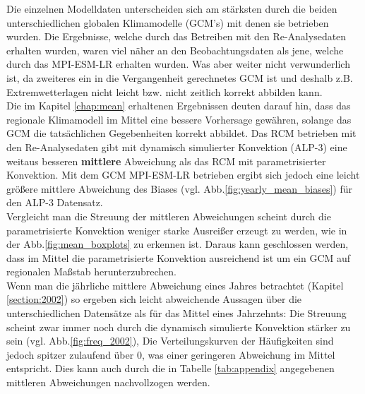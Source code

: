 Die einzelnen Modelldaten unterscheiden sich am stärksten durch die beiden unterschiedlichen globalen Klimamodelle (GCM's) mit denen sie betrieben wurden. Die Ergebnisse, welche durch das Betreiben mit den Re-Analysedaten erhalten wurden, waren viel näher an den Beobachtungsdaten als jene, welche durch das MPI-ESM-LR erhalten wurden. Was aber weiter nicht verwunderlich ist, da zweiteres ein in die Vergangenheit gerechnetes GCM ist und deshalb z.B. Extremwetterlagen nicht leicht bzw. nicht zeitlich korrekt abbilden kann.\vspace{7pt}\\

Die im Kapitel \ref{chap:mean} erhaltenen Ergebnissen deuten darauf hin, dass das regionale Klimamodell im Mittel eine bessere Vorhersage gewähren, solange das GCM die tatsächlichen Gegebenheiten korrekt abbildet. Das RCM betrieben mit den Re-Analysedaten gibt mit dynamisch simulierter Konvektion (ALP-3) eine weitaus besseren \textbf{mittlere} Abweichung als das RCM mit parametrisierter Konvektion. Mit dem GCM MPI-ESM-LR betrieben ergibt sich jedoch eine leicht größere mittlere Abweichung des Biases (vgl. Abb.\ref{fig:yearly_mean_biases}) für den ALP-3 Datensatz.\\
Vergleicht man die Streuung der mittleren Abweichungen scheint durch die parametrisierte Konvektion weniger starke Ausreißer erzeugt zu werden, wie in der Abb.\ref{fig:mean_boxplots} zu erkennen ist. Daraus kann geschlossen werden, dass im Mittel die parametrisierte Konvektion ausreichend ist um ein GCM auf regionalen Maßstab herunterzubrechen.\vspace{7pt}\\

Wenn man die jährliche mittlere Abweichung eines Jahres betrachtet (Kapitel \ref{section:2002}) so ergeben sich leicht abweichende Aussagen über die unterschiedlichen Datensätze als für das Mittel eines Jahrzehnts: Die Streuung scheint zwar immer noch durch die dynamisch simulierte Konvektion stärker zu sein (vgl. Abb.\ref{fig:freq_2002}), Die Verteilungskurven der Häufigkeiten sind jedoch spitzer zulaufend über 0, was einer geringeren Abweichung im Mittel entspricht. Dies kann auch durch die in Tabelle \ref{tab:appendix} angegebenen mittleren Abweichungen nachvollzogen werden.\vspace{7pt}\\

